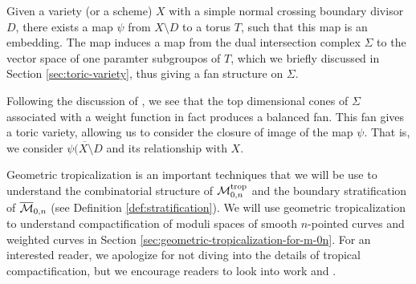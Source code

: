     Given a variety (or a scheme) $X$
    with a simple normal crossing boundary divisor $D$,
    there exists a map $\psi$ from $X \setminus D$ to a torus $T$,
    such that this map is an embedding.
    The map induces a map from the dual intersection complex $\Sigma$ to the vector space of one paramter subgroupos of $T$, which we briefly discussed in Section \ref{sec:toric-variety},
    thus giving a fan structure on $\Sigma$. 
    
    Following the discussion of \citet{Cueto2011},
    we see that the top dimensional cones of $\Sigma$ associated with a weight function in fact produces a balanced fan.
    This fan gives a toric variety,
    allowing us to consider the closure of image of the map $\psi$.
    That is, we consider $\overline{\psi(X \setminus D}$ and its relationship with $X$. 
    
    Geometric tropicalization is an important techniques 
    that we will be use to understand the combinatorial structure of $\mathcal{M}_{0, n}^{\operatorname{trop}}$ and the boundary stratification of $\overline{\mathcal{M}}_{0, n}$ (see Definition \ref{def:stratification}).
    We will use geometric tropicalization to understand compactification of moduli spaces of smooth $n$-pointed curves and weighted curves in Section \ref{sec:geometric-tropicalization-for-m-0n}.
    For an interested reader, 
    we apologize for not diving into the details of tropical compactification, but we encourage readers to look into work \citet{Tevelev2004} and \citet{Maclagan2015}. 

    
    
    
    
    
    
    